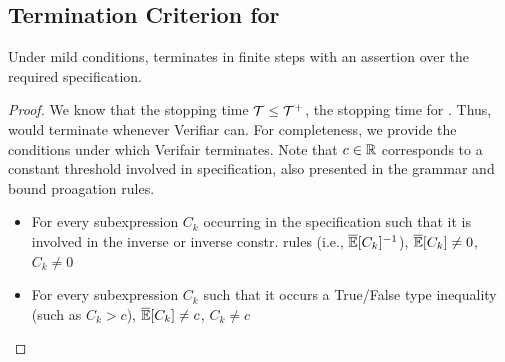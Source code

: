 \begin{subappendices}
\section{Termination Criterion for \AVOIRmethodname{}}
\label{sec:appendix:optimality}
\addtocounter{theorem}{-1}
\begin{corollary}
Under mild conditions, \AVOIRmethodname{} terminates in finite steps with an assertion over the required specification.
\label{corollary:termination}
\end{corollary}
\begin{proof}
We know that the stopping time ${\mathcal{T}} \leq {\mathcal{T}}^+$, the stopping time for \AVOIRmethodname{}.
Thus, \AVOIRmethodname{} would terminate whenever Verifiar can. 
For completeness, we provide the conditions under which Verifair terminates.
Note that $c \in \mathbb{R}$ corresponds to a constant threshold involved in specification, also presented in the grammar and bound proagation rules.
\begin{itemize}
    \item  For every subexpression $C_k$ occurring in the specification such that it is involved in the inverse or inverse constr. rules (i.e., $\overline{\mathbb{E}}[C_k]^{-1}$), $\overline{\mathbb{E}}[C_k] \neq 0$, $C_k \neq 0$
    \item For every subexpression $C_k$ such that it occurs a True/False type inequality (such as $C_k > c$), $\overline{\mathbb{E}}[C_k] \neq c$, $C_k \neq c$
\end{itemize}
\end{proof}



\end{subappendices}
